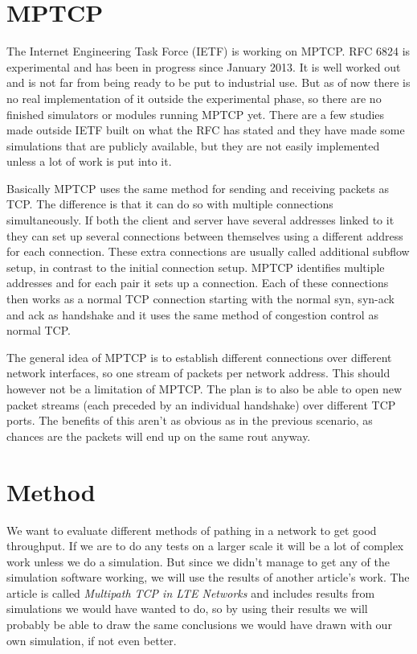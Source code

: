 \documentclass[11pt,twocolumn]{article}
\begin{document}
\section{MPTCP}
The Internet Engineering Task Force (IETF) is working on MPTCP. RFC 6824 is experimental and has been in progress since January 2013. It is well worked out and is not far from being ready to be put to industrial use. But as of now there is no real implementation of it outside the experimental phase, so there are no finished simulators or modules running MPTCP yet. There are a few studies made outside IETF built on what the RFC has stated and they have made some simulations that are publicly available, but they are not easily implemented unless a lot of work is put into it.

Basically MPTCP uses the same method for sending and receiving packets as TCP. The difference is that it can do so with multiple connections simultaneously. If both the client and server have several addresses linked to it they can set up several connections between themselves using a different address for each connection. These extra connections are usually called additional subflow setup, in contrast to the initial connection setup. MPTCP identifies multiple addresses and for each pair it sets up a connection. Each of these connections then works as a normal TCP connection starting with the normal syn, syn-ack and ack as handshake and it uses the same method of congestion control as normal TCP.

The general idea of MPTCP is to establish different connections over different network interfaces, so one stream of packets per network address. This should however not be a limitation of MPTCP. The plan is to also be able to open new packet streams (each preceded by an individual handshake) over different TCP ports. The benefits of this aren't as obvious as in the previous scenario, as chances are the packets will end up on the same rout anyway.

\section{Method}

We want to evaluate different methods of pathing in a network to get good throughput. If we are to do any tests on a larger scale it will be a lot of complex work unless we do a simulation. But since we didn't manage to get any of the simulation software working, we will use the results of another article's work. The article is called \emph{Multipath TCP in LTE Networks} and includes results from simulations we would have wanted to do, so by using their results we will probably be able to draw the same conclusions we would have drawn with our own simulation, if not even better.
\end{document}
